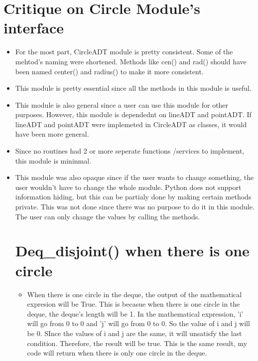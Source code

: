 \documentclass[12pt]{article}
\begin{document}
\section{Critique on Circle Module's interface} \label{CritiqueSect}
\begin{itemize}
\item For the most part, CircleADT module is pretty consistent. Some of the mehtod's naming were shortened. Methods like cen() and rad() should have been named center() and radius() to make it more consistent.
\item This module is pretty essential since all the methods in this module is useful.
\item  This module is also general since a user can use this module for other purposes. However, this module is dependednt on lineADT and pointADT. If lineADT and pointADT were implemeted in CircleADT as classes, it would have been more general.
\item  Since no routines had 2 or more seperate functions /services to implement, this module is mininmal. 
\item This module was also opaque since if the user wants to change something, the user wouldn't have to change the whole module. Python does not support information hiding, but this can be partialy done by making certain methods private. This was not done since there was no purpose to do it in this module. The user can only change the values by calling the methods.

\newpage
\section{Deq\_disjoint() when there is one circle} \label{DequeSect}
\begin{itemize}
\item When there is one circle in the deque, the output of the mathematical expresion will be True. This is becasue when there is one circle in the deque, the deque's length will be 1. In the mathematical expression, 'i' will go from 0 to 0 and 'j' will go from 0 to 0. So the value of i and j will be 0. SInce the values of i and j are the same, it will unsatisfy the last condition. Therefore, the result will be true. This is the same result, my code will return when there is only one circle in the deque.
\end{itemize}
\end{itemize}
\end{document}
